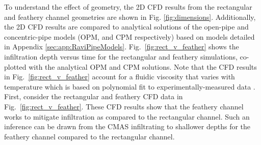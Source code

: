 \documentclass{UCF_ETD}
\begin{document}
To understand the effect of geometry, the 2D CFD results from the rectangular and feathery channel geometries are shown in Fig. \ref{fig:dimensions}.
Additionally, the 2D CFD results are compared to analytical solutions of the open-pipe and concentric-pipe models (OPM, and CPM respectively) \cite{Naraparaju2019} based on models detailed in Appendix \ref{sec:app:RaviPipeModels}. 
Fig.~\ref{fig:rect_v_feather} shows the infiltration depth versus time for the rectangular and feathery simulations, co-plotted with the analytical OPM and CPM solutions. 
Note that the CFD results in Fig.~\ref{fig:rect_v_feather} account for a fluidic viscosity that varies with temperature which is based on polynomial fit to experimentally-measured data \cite{Naraparaju2017}.\\

First, consider the rectangular and feathery CFD data in Fig.~\ref{fig:rect_v_feather}.
These CFD results show that the feathery channel works to mitigate infiltration as compared to the rectangular channel. Such an inference can be drawn from the CMAS infiltrating to shallower depths for the feathery channel compared to the rectangular channel. 
\end{document}
